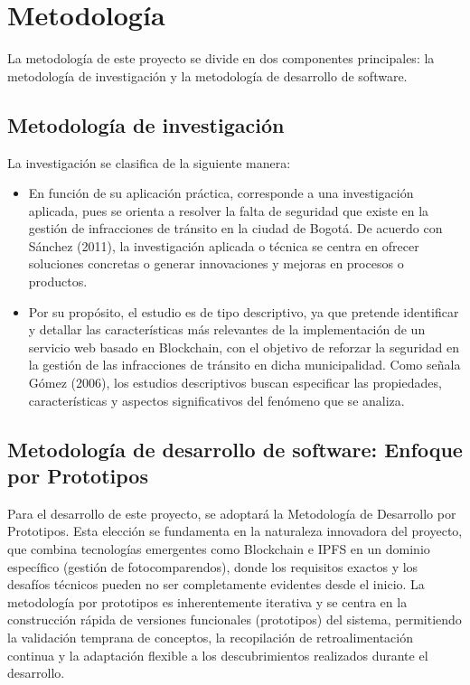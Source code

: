 \section{Metodología}
La metodología de este proyecto se divide en dos componentes principales: la metodología de investigación y la metodología de desarrollo de software.  

\subsection{Metodología de investigación}
La investigación se clasifica de la siguiente manera:
\begin{itemize}
  \item En función de su aplicación práctica, corresponde a una investigación aplicada, pues se orienta a resolver la falta de seguridad que existe en la gestión de infracciones de tránsito en la ciudad de Bogotá. De acuerdo con Sánchez (2011), la investigación aplicada o técnica se centra en ofrecer soluciones concretas o generar innovaciones y mejoras en procesos o productos.
  \item Por su propósito, el estudio es de tipo descriptivo, ya que pretende identificar y detallar las características más relevantes de la implementación de un servicio web basado en Blockchain, con el objetivo de reforzar la seguridad en la gestión de las infracciones de tránsito en dicha municipalidad. Como señala Gómez (2006), los estudios descriptivos buscan especificar las propiedades, características y aspectos significativos del fenómeno que se analiza.
\end{itemize}
\subsection{Metodología de desarrollo de software: Enfoque por Prototipos}
Para el desarrollo de este proyecto, se adoptará la Metodología de Desarrollo por Prototipos. Esta elección se fundamenta en la naturaleza innovadora del proyecto, que combina tecnologías emergentes como Blockchain e IPFS en un dominio específico (gestión de fotocomparendos), donde los requisitos exactos y los desafíos técnicos pueden no ser completamente evidentes desde el inicio. La metodología por prototipos es inherentemente iterativa y se centra en la construcción rápida de versiones funcionales (prototipos) del sistema, permitiendo la validación temprana de conceptos, la recopilación de retroalimentación continua y la adaptación flexible a los descubrimientos realizados durante el desarrollo. 
